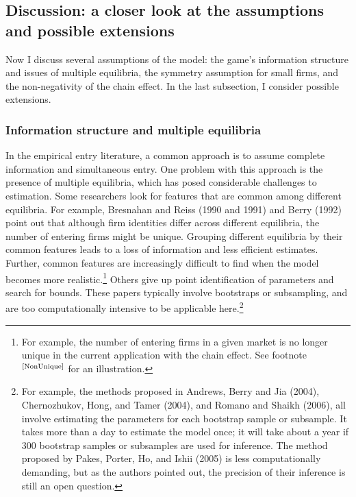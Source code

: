 \documentclass[notitlepage,onecolumn,11pt]{article}
\begin{document}
\subsection{Discussion: a closer look at the assumptions and possible
extensions\label{Chain}}

Now I discuss several assumptions of the model: the game's information
structure and issues of multiple equilibria, the symmetry assumption for
small firms, and the non-negativity of the chain effect. In the last
subsection, I consider possible extensions.

\subsubsection{Information structure and multiple equilibria}

In the empirical entry literature, a common approach is to assume complete
information and simultaneous entry. One problem with this approach is the
presence of multiple equilibria, which has posed considerable challenges to
estimation. Some researchers look for features that are common among
different equilibria. For example, Bresnahan and Reiss (1990 and 1991) and
Berry (1992) point out that although firm identities differ across different
equilibria, the number of entering firms might be unique. Grouping different
equilibria by their common features leads to a loss of information and less
efficient estimates. Further, common features are increasingly difficult to
find when the model becomes more realistic.\footnote{%
For example, the number of entering firms in a given market is no longer
unique in the current application with the chain effect. See footnote $^{%
\text{\ref{NonUnique}}}$ for an illustration.} Others give up point
identification of parameters and search for bounds. These papers typically
involve bootstraps or subsampling, and are too computationally intensive to
be applicable here.\footnote{%
For example, the methods proposed in Andrews, Berry and Jia (2004),
Chernozhukov, Hong, and Tamer (2004), and Romano and Shaikh (2006), all
involve estimating the parameters for each bootstrap sample or subsample. It
takes more than a day to estimate the model once; it will take about a year
if 300 bootstrap samples or subsamples are used for inference. The method
proposed by Pakes, Porter, Ho, and Ishii (2005) is less computationally
demanding, but as the authors pointed out, the precision of their inference
is still an open question.}
\end{document}
